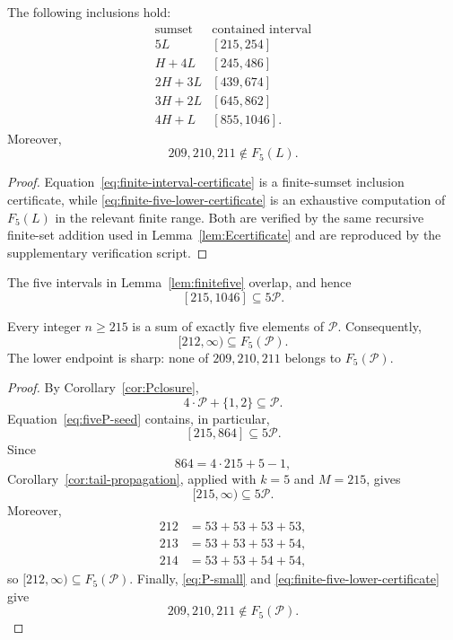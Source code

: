 \documentclass{ws-ijfcs}
\newcommand{\Pset}{\mathcal P}
\begin{document}
\begin{lemma}\label{lem:finitefive}
The following inclusions hold:
\begin{equation}\label{eq:finite-interval-certificate}
\begin{array}{c|c}
\text{sumset}&\text{contained interval}\\ \hline
5L &[215,254]\\
H+4L &[245,486]\\
2H+3L &[439,674]\\
3H+2L &[645,862]\\
4H+L &[855,1046].
\end{array}
\end{equation}
Moreover,
\begin{equation}\label{eq:finite-five-lower-certificate}
 209,210,211\notin F_5(L).
\end{equation}
\end{lemma}

\begin{proof}
Equation~\eqref{eq:finite-interval-certificate} is a finite-sumset
inclusion certificate, while \eqref{eq:finite-five-lower-certificate}
is an exhaustive computation of $F_5(L)$ in the relevant finite range.
Both are verified by the same recursive finite-set addition used in
Lemma~\ref{lem:Ecertificate} and are reproduced by the supplementary
verification script.
\end{proof}

The five intervals in Lemma~\ref{lem:finitefive} overlap, and hence
\begin{equation}\label{eq:fiveP-seed}
 [215,1046]\subseteq5\Pset.
\end{equation}

\begin{proposition}\label{prop:fiveP}
Every integer $n\geq215$ is a sum of exactly five elements of $\Pset$.
Consequently,
\[
 [212,\infty)\subseteq F_5(\Pset).
\]
The lower endpoint is sharp: none of $209,210,211$ belongs to
$F_5(\Pset)$.
\end{proposition}

\begin{proof}
By Corollary~\ref{cor:Pclosure},
\[
 4\cdot\Pset+\{1,2\}\subseteq\Pset.
\]
Equation~\eqref{eq:fiveP-seed} contains, in particular,
\[
 [215,864]\subseteq5\Pset.
\]
Since
\[
 864=4\cdot215+5-1,
\]
Corollary~\ref{cor:tail-propagation}, applied with $k=5$ and $M=215$,
gives
\[
 [215,\infty)\subseteq5\Pset.
\]
Moreover,
\[
\begin{aligned}
212&=53+53+53+53,\\
213&=53+53+53+54,\\
214&=53+53+54+54,
\end{aligned}
\]
so $[212,\infty)\subseteq F_5(\Pset)$.  Finally,
\eqref{eq:P-small} and \eqref{eq:finite-five-lower-certificate} give
\[
 209,210,211\notin F_5(\Pset).
\]
\end{proof}
\end{document}
